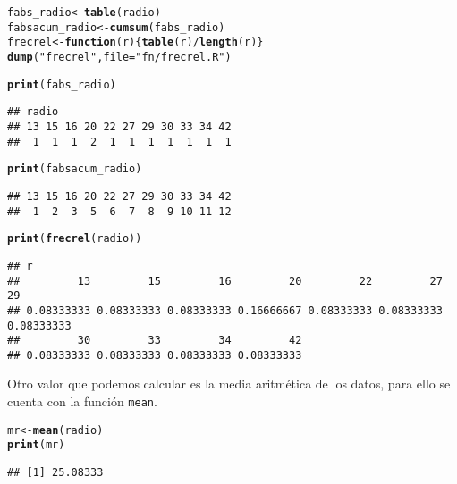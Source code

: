 \documentclass[12pt]{report}\usepackage[]{graphicx}\usepackage[dvipsnames]{xcolor}
\makeatletter
\newcommand{\hlstr}[1]{\textcolor[rgb]{0.192,0.494,0.8}{#1}}%
\newcommand{\hlopt}[1]{\textcolor[rgb]{0,0,0}{#1}}%
\newcommand{\hlstd}[1]{\textcolor[rgb]{0.345,0.345,0.345}{#1}}%
\newcommand{\hlkwa}[1]{\textcolor[rgb]{0.161,0.373,0.58}{\textbf{#1}}}%
\newcommand{\hlkwb}[1]{\textcolor[rgb]{0.69,0.353,0.396}{#1}}%
\newcommand{\hlkwc}[1]{\textcolor[rgb]{0.333,0.667,0.333}{#1}}%
\newcommand{\hlkwd}[1]{\textcolor[rgb]{0.737,0.353,0.396}{\textbf{#1}}}%
\newenvironment{kframe}{%
 \def\at@end@of@kframe{}%
 \ifinner\ifhmode%
  \def\at@end@of@kframe{\end{minipage}}%
  \begin{minipage}{\columnwidth}%
 \fi\fi%
 \def\FrameCommand##1{\hskip\@totalleftmargin \hskip-\fboxsep
 \colorbox{shadecolor}{##1}\hskip-\fboxsep
     \hskip-\linewidth \hskip-\@totalleftmargin \hskip\columnwidth}%
 \MakeFramed {\advance\hsize-\width
   \@totalleftmargin\z@ \linewidth\hsize
   \@setminipage}}%
 {\par\unskip\endMakeFramed%
 \at@end@of@kframe}
\newenvironment{knitrout}{}{} %
\makeatother
\begin{document}
\begin{knitrout}
\color{fgcolor}\begin{kframe}
\begin{alltt}
\hlstd{fabs_radio} \hlkwb{<-} \hlkwd{table}\hlstd{(radio)}
\hlstd{fabsacum_radio} \hlkwb{<-} \hlkwd{cumsum}\hlstd{(fabs_radio)}
\hlstd{frecrel} \hlkwb{<-} \hlkwa{function}\hlstd{(}\hlkwc{r}\hlstd{)\{}\hlkwd{table}\hlstd{(r)}\hlopt{/}\hlkwd{length}\hlstd{(r)\}}
\hlkwd{dump}\hlstd{(}\hlstr{"frecrel"}\hlstd{,} \hlkwc{file} \hlstd{=} \hlstr{"fn/frecrel.R"}\hlstd{)}

\hlkwd{print}\hlstd{(fabs_radio)}
\end{alltt}
\begin{verbatim}
## radio
## 13 15 16 20 22 27 29 30 33 34 42 
##  1  1  1  2  1  1  1  1  1  1  1
\end{verbatim}
\begin{alltt}
\hlkwd{print}\hlstd{(fabsacum_radio)}
\end{alltt}
\begin{verbatim}
## 13 15 16 20 22 27 29 30 33 34 42 
##  1  2  3  5  6  7  8  9 10 11 12
\end{verbatim}
\begin{alltt}
\hlkwd{print}\hlstd{(}\hlkwd{frecrel}\hlstd{(radio))}
\end{alltt}
\begin{verbatim}
## r
##         13         15         16         20         22         27         29 
## 0.08333333 0.08333333 0.08333333 0.16666667 0.08333333 0.08333333 0.08333333 
##         30         33         34         42 
## 0.08333333 0.08333333 0.08333333 0.08333333
\end{verbatim}
\end{kframe}
\end{knitrout}
			
			Otro valor que podemos calcular es la media aritmética de los datos, para ello se cuenta con la función \texttt{mean}. 
			
\begin{knitrout}
\color{fgcolor}\begin{kframe}
\begin{alltt}
\hlstd{mr} \hlkwb{<-} \hlkwd{mean}\hlstd{(radio)}
\hlkwd{print}\hlstd{(mr)}
\end{alltt}
\begin{verbatim}
## [1] 25.08333
\end{verbatim}
\end{kframe}
\end{knitrout}
			
\end{document}
